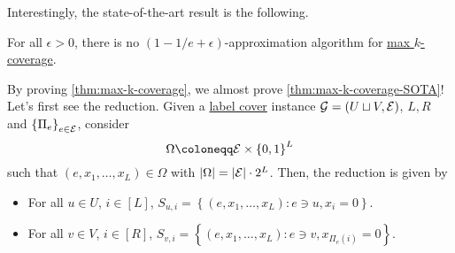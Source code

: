Interestingly, the state-of-the-art result is the following.

\begin{theorem}\label{thm:max-k-coverage-SOTA}
	For all \(\epsilon >0\), there is no \((1 - 1/e + \epsilon )\)-approximation algorithm for \hyperref[prb:max-k-coverage]{max \(k\)-coverage}.
\end{theorem}

By proving \autoref{thm:max-k-coverage}, we almost prove \autoref{thm:max-k-coverage-SOTA}! Let's first see the reduction. Given a \hyperref[prb:label-cover]{label cover} instance \(\mathcal{\MakeUppercase{g}} =(U \sqcup V, \mathcal{\MakeUppercase{e}} )\), \(L, R\) and \(\left\{ \Pi _e \right\} _{e\in \mathcal{\MakeUppercase{e}} }\), consider
\[
	\Omega \coloneqq \mathcal{\MakeUppercase{e}} \times \left\{ 0, 1 \right\} ^L
\]
such that \((e, x_1, \ldots , x_L  )\in \Omega \) with \(\vert \Omega  \vert = \vert \mathcal{\MakeUppercase{e}}  \vert \cdot 2 ^L\). Then, the reduction is given by
\begin{itemize}
	\item For all \(u\in U\), \(i\in [L]\), \(S_{u, i} = \left\{ (e, x_1, \ldots , x_L ) \colon e\ni u, x_i = 0 \right\} \).
	\item For all \(v\in V\), \(i\in [R]\), \(S_{v, i} = \left\{ (e, x_1, \ldots , x_L ) \colon e\ni v, x_{\Pi_e(i)} = 0 \right\} \).
\end{itemize}